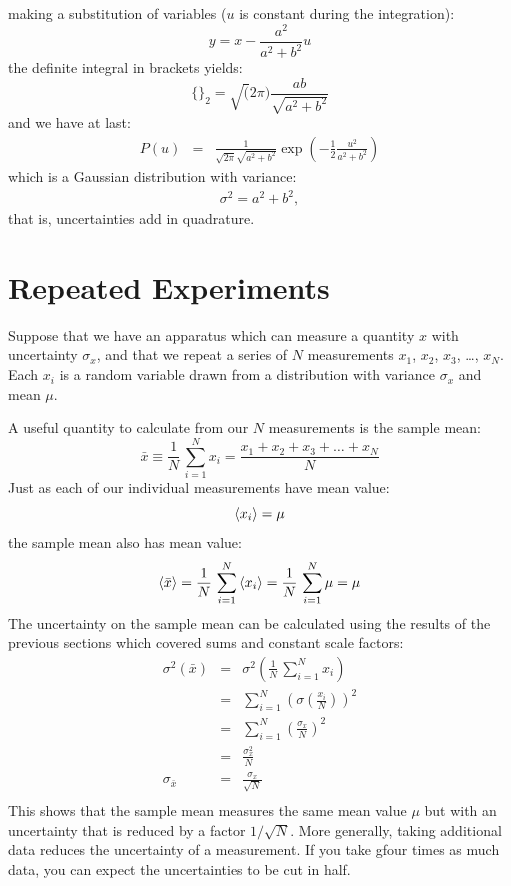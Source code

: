\documentclass[12pt,oneside]{book}
\begin{document}
making a substitution of variables ($u$ is constant during the integration):
\begin{equation*}
y = x-\frac{a^2}{a^2+b^2}u
\end{equation*}
the definite integral in brackets yields:
\begin{equation}
\{\}_2 = \sqrt(2 \pi) \frac{a b}{\sqrt{a^2+b^2}}
\end{equation}
and we have at last:
\begin{eqnarray*}
P(u) &=& \frac{1}{\sqrt{2\pi} \sqrt{a^2+b^2}}  \exp \left( -\frac{1}{2} \frac{u^2}{a^2+b^2} \right)
\end{eqnarray*}
which is a Gaussian distribution with variance:
\begin{eqnarray*}
\sigma^2 = a^2 + b^2,
\end{eqnarray*}
that is, uncertainties add in quadrature.

\section{Repeated Experiments}

Suppose that we have an apparatus which can measure a quantity $x$
with uncertainty $\sigma_x$, and that we repeat a series of $N$
measurements $x_1$, $x_2$, $x_3$, \ldots, $x_N$. Each $x_i$ is a
random variable drawn from a distribution with variance $\sigma_x$ and
mean $\mu$.

A useful quantity to calculate from our $N$ measurements is the sample mean:
\begin{displaymath}
  \bar{x} \equiv \frac{1}{N} \, \sum_{i=1}^{N} x_i = \frac{x_1 + x_2 + x_3 + \ldots + x_N}{N}
\end{displaymath}
Just as each of our individual measurements have mean value:
\begin{displaymath}
\braket{x_i} = \mu  
\end{displaymath}
the sample mean also has mean value:
\begin{displaymath}
  \braket{\bar{x}} = \frac{1}{N} \, \sum_{i=1}^{N} \braket{x_i}
= \frac{1}{N} \, \sum_{i=1}^{N} \mu = \mu
\end{displaymath}
The uncertainty on the sample mean can be calculated using the results of the previous sections which covered sums and constant scale factors:
\begin{eqnarray*}
  \sigma^2(\bar{x}) &=& \sigma^2\left( \frac{1}{N} \, \sum_{i=1}^{N} x_i \right) \\
  &=& \sum_{i=1}^{N} \left( \sigma \left( \frac{x_i}{N} \right) \right)^2 \\
  &=& \sum_{i=1}^{N} \left( \frac{\sigma_x}{N} \right)^2 \\ 
  &=& \frac{\sigma_x^2}{N} \\
 \sigma_{\bar{x}} &=& \frac{\sigma_x}{\sqrt{N}} \\
\end{eqnarray*}
This shows that the sample mean measures the same mean value $\mu$ but
with an uncertainty that is reduced by a factor $1/\sqrt{N}$.  More
generally, taking additional data reduces the uncertainty of a
measurement.  If you take gfour times as much data, you can expect the
uncertainties to be cut in half.
\end{document}
